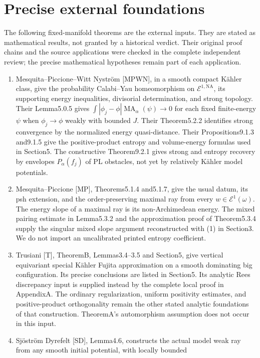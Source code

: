 \documentclass[11pt]{article}
\newcommand{\MA}{\operatorname{MA}}
\newcommand{\NA}{\mathrm{NA}}
\begin{document}
\section{Precise external foundations}
The following fixed-manifold theorems are the external inputs. They
are stated as mathematical results, not granted by a historical verdict.
Their original proof chains and the source applications were checked
in the complete independent review; the precise mathematical
hypotheses remain part of each application.
\begin{enumerate}
\item Mesquita--Piccione--Witt Nystr\"om [MPWN], in a smooth compact
K\"ahler class, give the probability Calabi--Yau homeomorphism on
$\mathcal E^{1,\NA}$, its supporting energy inequalities, divisorial
determination, and strong topology. Their Lemma5.0.5 gives
$\int|\phi_j-\phi|\MA_\alpha(\psi)\to0$ for each fixed finite-energy
$\psi$ when $\phi_j\to\phi$ weakly with bounded $J$.
Their Theorem5.2.2 identifies strong convergence by the normalized
energy quasi-distance. Their Propositions9.1.3 and9.1.5 give the
positive-product entropy and volume-energy formulas used in Section5.
The constructive Theorem9.2.1 gives strong and entropy recovery by
envelopes $P_\alpha(f_j)$ of PL obstacles, not yet by relatively
K\"ahler model potentials.
\item Mesquita--Piccione [MP], Theorems5.1.4 and5.1.7, give the usual
datum, its psh extension, and the order-preserving maximal ray from
every $w\in\mathcal E^1(\omega)$. The energy slope of a maximal ray is
its non-Archimedean energy. The mixed pairing estimate in Lemma5.3.2
and the approximation proof of Theorem5.3.4 supply the singular mixed
slope argument reconstructed with (1) in Section3. We do not import
an uncalibrated printed entropy coefficient.
\item Trusiani [T], TheoremB, Lemmas3.4--3.5 and Section5, give
vertical equivariant special K\"ahler Fujita approximation on a smooth
dominating big configuration. Its precise conclusions are listed in
Section5. Its analytic Rees discrepancy input is supplied instead by
the complete local proof in AppendixA. The ordinary regularization,
uniform positivity estimates, and positive-product orthogonality
remain the other stated analytic foundations of that construction.
TheoremA's automorphism assumption does not occur in this input.
\item Sj\"ostr\"om Dyrefelt [SD], Lemma4.6, constructs the actual
model weak ray from any smooth initial potential, with locally bounded

\end{enumerate}
\end{document}
